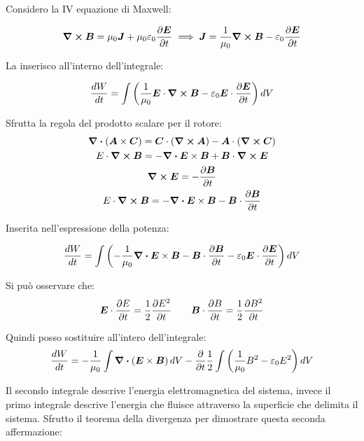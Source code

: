 \documentclass[a4paper]{scrarticle}
\begin{document}
Considero la IV equazione di Maxwell:

\begin{equation*}
    \curl {\bm B} = \mu_0 \bm J + \mu_0\varepsilon_0 \pdv{\bm E}{t} \implies \bm J = \frac{1}{\mu_0} \curl {\bm B} - \varepsilon_0 \pdv{\bm E}{t}
\end{equation*}

La inserisco all'interno dell'integrale:

\begin{equation*}
    \frac{dW}{dt} = \int \left(\frac{1}{\mu_0} \bm E \cdot \curl{\bm B} - \varepsilon_0 \bm E \cdot \pdv{\bm E}{t} \right) dV
\end{equation*}

Sfrutta la regola del prodotto scalare per il rotore:
\begin{gather*}
    \div (\bm A \times \bm C) = \bm C \cdot (\curl{\bm A}) - \bm A \cdot (\curl{\bm C})\\
    E \cdot \curl{\bm B} = - \div{\bm E \times \bm B} + \bm B \cdot \curl{\bm E}\\
    \curl{\bm E} = - \pdv{\bm B}{t}\\
    E \cdot \curl{\bm B} = - \div{\bm E \times \bm B} - \bm B \cdot \pdv{\bm B}{t}
\end{gather*}

Inserita nell'espressione della potenza:

\begin{equation*}
    \frac{dW}{dt} = \int \left(- \frac{1}{\mu_0}\div{\bm E \times \bm B} - \bm B \cdot \pdv{\bm B}{t} - \varepsilon_0 \bm E \cdot \pdv{\bm E}{t}\right)dV
\end{equation*}

Si può osservare che:
\begin{equation*}
    \bm E \cdot \pdv{E}{t} = \frac{1}{2} \pdv{E^2}{t} \qquad
    \bm B \cdot \pdv{B}{t} = \frac{1}{2} \pdv{B^2}{t}
\end{equation*}

Quindi posso sostituire all'intero dell'integrale:
\begin{equation*}
    \frac{dW}{dt} = -\frac{1}{\mu_0}\int \div{\left(\bm E \times \bm B\right)} dV - \pdv{t}\frac{1}{2}\int\left(\frac{1}{\mu_0}B^2- \varepsilon_0 {E^2}\right) dV
\end{equation*}

Il secondo integrale descrive l'energia elettromagnetica del sistema, invece il primo integrale descrive l'energia che fluisce attraverso la superficie che delimita il sistema.
Sfrutto il teorema della divergenza per dimostrare questa seconda affermazione:
\end{document}
